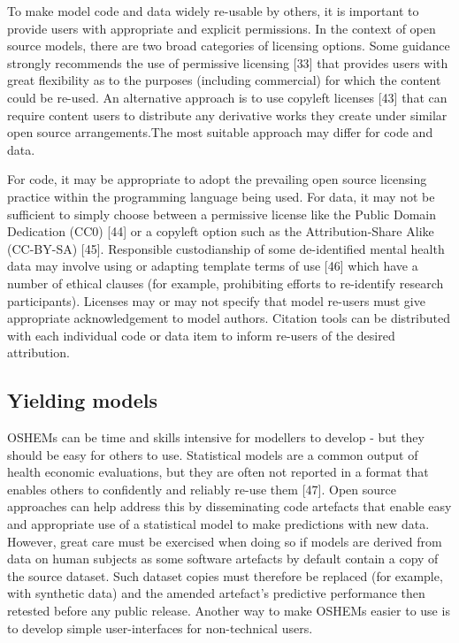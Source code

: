 \documentclass[
]{article}
\begin{document}
To make model code and data widely re-usable by others, it is important to provide users with appropriate and explicit permissions. In the context of open source models, there are two broad categories of licensing options. Some guidance strongly recommends the use of permissive licensing {[}33{]} that provides users with great flexibility as to the purposes (including commercial) for which the content could be re-used. An alternative approach is to use copyleft licenses {[}43{]} that can require content users to distribute any derivative works they create under similar open source arrangements.The most suitable approach may differ for code and data.

For code, it may be appropriate to adopt the prevailing open source licensing practice within the programming language being used. For data, it may not be sufficient to simply choose between a permissive license like the Public Domain Dedication (CC0) {[}44{]} or a copyleft option such as the Attribution-Share Alike (CC-BY-SA) {[}45{]}. Responsible custodianship of some de-identified mental health data may involve using or adapting template terms of use {[}46{]} which have a number of ethical clauses (for example, prohibiting efforts to re-identify research participants). Licenses may or may not specify that model re-users must give appropriate acknowledgement to model authors. Citation tools can be distributed with each individual code or data item to inform re-users of the desired attribution.

\hypertarget{yielding-models}{%
\subsection{Yielding models}\label{yielding-models}}

OSHEMs can be time and skills intensive for modellers to develop - but they should be easy for others to use. Statistical models are a common output of health economic evaluations, but they are often not reported in a format that enables others to confidently and reliably re-use them {[}47{]}. Open source approaches can help address this by disseminating code artefacts that enable easy and appropriate use of a statistical model to make predictions with new data. However, great care must be exercised when doing so if models are derived from data on human subjects as some software artefacts by default contain a copy of the source dataset. Such dataset copies must therefore be replaced (for example, with synthetic data) and the amended artefact's predictive performance then retested before any public release. Another way to make OSHEMs easier to use is to develop simple user-interfaces for non-technical users.
\end{document}
